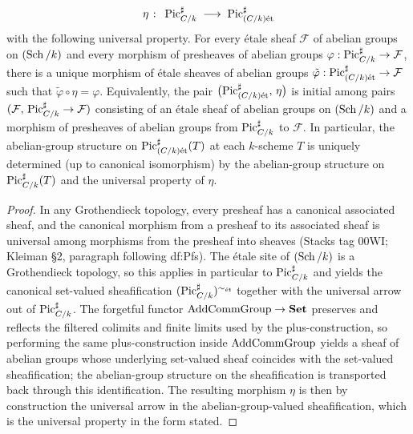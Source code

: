 \begin{theorem}
  \[
    \eta \;\colon\; \operatorname{Pic}^\sharp_{C/k} \;\longrightarrow\;
    \operatorname{Pic}^\sharp_{(C/k)\mathrm{\acute{e}t}}
  \]
  with the following universal property. For every \'etale sheaf
  \(\mathcal{F}\) of abelian groups on \((\operatorname{Sch}/k)\) and every morphism
  of presheaves of abelian groups
  \(\varphi : \operatorname{Pic}^\sharp_{C/k} \to \mathcal{F}\), there is a unique
  morphism of \'etale sheaves of abelian groups
  \(\tilde\varphi : \operatorname{Pic}^\sharp_{(C/k)\mathrm{\acute{e}t}} \to \mathcal{F}\) such that
  \(\tilde\varphi \circ \eta = \varphi\). Equivalently, the pair
  \(\bigl(\operatorname{Pic}^\sharp_{(C/k)\mathrm{\acute{e}t}}, \, \eta\bigr)\) is initial among
  pairs \((\mathcal{F}, \, \operatorname{Pic}^\sharp_{C/k} \to \mathcal{F})\)
  consisting of an \'etale sheaf of abelian groups on \((\operatorname{Sch}/k)\) and
  a morphism of presheaves of abelian groups from \(\operatorname{Pic}^\sharp_{C/k}\)
  to \(\mathcal{F}\). In particular, the abelian-group structure on
  \(\operatorname{Pic}^\sharp_{(C/k)\mathrm{\acute{e}t}}(T)\) at each \(k\)-scheme \(T\) is uniquely
  determined (up to canonical isomorphism) by the abelian-group
  structure on \(\operatorname{Pic}^\sharp_{C/k}(T)\) and the universal property of
  \(\eta\).
\end{theorem}

\begin{proof}

  In any Grothendieck topology, every presheaf has a canonical
  associated sheaf, and the canonical morphism from a presheaf to its
  associated sheaf is universal among morphisms from the presheaf into
  sheaves (Stacks tag 00WI; Kleiman \S 2, paragraph following
  df:Pfs). The \'etale site of \((\operatorname{Sch}/k)\) is a Grothendieck
  topology, so this applies in particular to \(\operatorname{Pic}^\sharp_{C/k}\) and
  yields the canonical set-valued sheafification
  \((\operatorname{Pic}^\sharp_{C/k})^{\sim_{\mathrm{\acute{e}t}}}\) together with the universal arrow
  out of \(\operatorname{Pic}^\sharp_{C/k}\). The forgetful functor
  \(\mathrm{AddCommGroup} \to \mathbf{Set}\) preserves and reflects the
  filtered colimits and finite limits used by the plus-construction,
  so performing the same plus-construction inside \(\mathrm{AddCommGroup}\)
  yields a sheaf of abelian groups whose underlying set-valued sheaf
  coincides with the set-valued sheafification; the abelian-group
  structure on the sheafification is transported back through this
  identification. The resulting morphism \(\eta\) is then by
  construction the universal arrow in the abelian-group-valued
  sheafification, which is the universal property in the form stated.
\end{proof}

